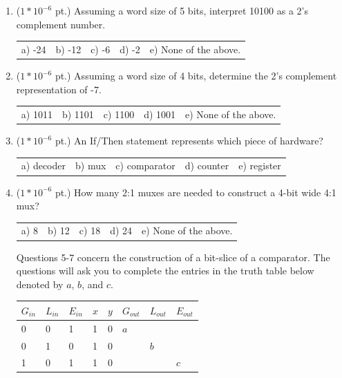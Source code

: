 \documentclass{article}
\begin{document}
\begin{enumerate}
\item {($1*10^{-6}$ pt.)} Assuming a word size of 5 bits, interpret 10100 as a 2's complement
number.

\begin{tabular}{p{0.6in} p{0.6in} p{0.6in} p{0.6in} l}
a) -24 & b) -12 & c) -6 & d) -2 & e) None of the above.
\end{tabular}

\item {($1*10^{-6}$ pt.)} Assuming a word size of 4 bits, determine the 2's complement
representation of -7.

\begin{tabular}{p{0.6in} p{0.6in} p{0.6in} p{0.6in} l}
a) 1011 & b) 1101 & c) 1100 & d) 1001 & e) None of the above.
\end{tabular}

\item {($1*10^{-6}$ pt.)} An If/Then statement represents which piece of hardware?

\begin{tabular}{p{0.8in} p{0.6in} p{0.9in} p{0.8in} l}
a) decoder & b) mux & c) comparator & d) counter & e) register
\end{tabular}

\item {($1*10^{-6}$ pt.)} How many 2:1 muxes are needed to construct a 4-bit wide
4:1 mux?

\begin{tabular}{p{0.6in} p{0.6in} p{0.6in} p{0.6in} l}
a) 8 & b) 12 & c) 18 & d) 24 & e) None of the above.
\end{tabular}

\pagebreak
Questions 5-7 concern the construction of a bit-slice of a comparator.  The questions 
will ask you to complete the entries in the truth table below denoted by $a$, $b$, and
$c$.

\begin{tabular}{l|l|l|l|l||l|l|l}
$G_{in}$ & $L_{in}$ & $E_{in}$ & $x$ & $y$ & $G_{out}$ & $L_{out}$ & $E_{out}$ \\ \hline
    0    &    0     &     1    &  1  &  0  &   $a$     &           &           \\ \hline
    0    &    1     &     0    &  1  &  0  &           &   $b$     &           \\ \hline
    1    &    0     &     1    &  1  &  0  &           &           &    $c$    \\
\end{tabular}


\end{enumerate}
\end{document}
